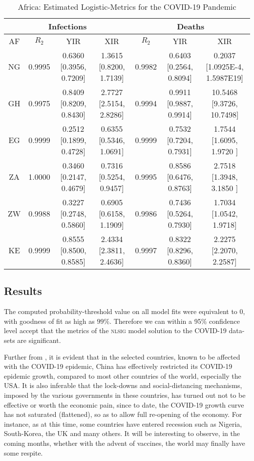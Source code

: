 \documentclass[journal]{IEEEtran}
\theoremstyle{plain}
\theoremstyle{definition}
\theoremstyle{remark}
\begin{document}
\begin{table*}[t]
	\caption{Africa: Estimated Logistic-Metrics for the COVID-19 Pandemic}
	\centering
	\def\arraystretch{1.5}\begin{tabular}{|c|c|c|c|c|c|c|}
	\hline
	\multicolumn{4}{|c||}{Infections}&
	\multicolumn{3}{c|}{Deaths}\\
	\hline\hline
	AF & $R_2$ & YIR & XIR & $R_2$ & YIR & XIR \\
	\hline\hline
	NG&  0.9995	
	&  	0.6360 [0.3956, 0.7209]&  1.3615 [0.8200, 1.7139]&  0.9982	&  0.6403 [0.2564, 0.8094]&0.2037 [1.0925E-4, 1.5987E19] \\
	\hline
	GH&  0.9975	
	&  	0.8409 [0.8209, 0.8430]&  2.7727 [2.5154, 2.8286]&  0.9994	&  0.9911	[0.9887, 0.9914]&  10.5468	[9.3726, 10.7498]	\\
	\hline
	EG&  0.9999		
	&  0.2512 [0.1899, 0.4728]&  0.6355 [0.5346,	1.0691]& 0.9999 &  0.7532 [0.7204, 0.7931]& 	1.7544 [1.6095,	1.9720	] \\
	\hline
	ZA&  1.0000	
	&  0.3460 [0.2147, 0.4679]&  0.7316 [0.5254, 0.9457]& 0.9995  & 	0.8586	[0.6476, 0.8763] &  2.7518	[1.3948, 3.1850 ]\\
	\hline
	ZW&  0.9988	
	&  0.3227 [0.2748, 0.5860]&  0.6905 [0.6158, 1.1909]&  0.9986	&  0.7436 [0.5264, 0.7930]& 1.7034	[1.0542,	1.9718]	 \\
	\hline
	KE&  0.9999	
	&  	0.8555 [0.8500,	0.8585]&  2.4334 [2.3811, 2.4636]& 0.9997	 &  0.8322	[0.8296, 0.8360]& 2.2275	[2.2070,	2.2587] \\
	\hline
\end{tabular}
\label{table_africa}
\end{table*}



\subsection{Results}\label{sec_results}
The computed probability-threshold value on all model fits were equivalent to 0, with goodness of fit as high as $99\%$. Therefore we can within a 95\% confidence level accept that the metrics of the \textsc{nlsig} model solution to the COVID-19 data-sets are significant.

Further from , it is evident that in the selected countries, known to be affected with the COVID-19 epidemic, China has effectively restricted its COVID-19 epidemic growth, compared to most other countries of the world, especially the USA. It is also inferable that the lock-downs and social-distancing mechanisms, imposed by the various governments in these countries, has turned out not to be effective or worth the economic pain, since to date, the COVID-19 growth curve has not saturated (flattened), so as to allow full re-opening of the economy.
For instance, as at this time, some countries have entered recession such as Nigeria, South-Korea, the UK and many others. It will be interesting to observe, in the coming months, whether with the advent of vaccines, the world may finally have some respite.
\end{document}
